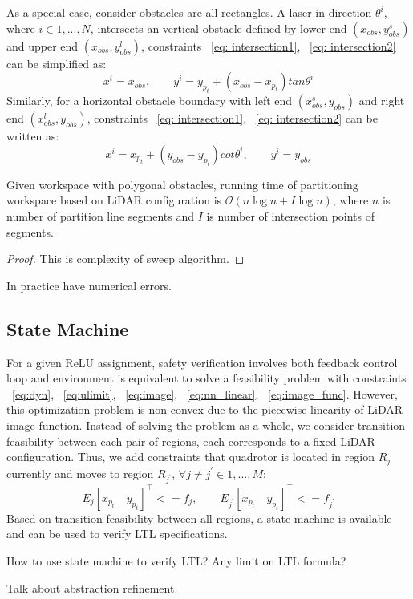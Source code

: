 As a special case, consider obstacles are all rectangles. 
A laser in direction $\theta^i$, where $i \in {1, ..., N}$, intersects an vertical obstacle 
defined by lower end $(x_{obs}, y_{obs}^s)$ and upper end $(x_{obs}, y_{obs}^l)$, 
constraints ~\eqref{eq: intersection1}, ~\eqref{eq: intersection2} can be simplified as:
\begin{equation}
    \label{eq:vertical}
    x^i = x_{obs}, \qquad y^i = y_{p_t} + (x_{obs} - x_{p_t}) tan \theta^i
\end{equation}
Similarly, for a horizontal obstacle boundary with left end $(x_{obs}^s, y_{obs})$ and right end $(x_{obs}^l, y_{obs})$,
constraints ~\eqref{eq: intersection1}, ~\eqref{eq: intersection2} can be written as:
\begin{equation} 
    \label{eq:horizontal}
    x^i = x_{p_t} + (y_{obs} - y_{p_t}) cot \theta^i, \qquad y^i = y_{obs}
\end{equation}


\begin{theorem}
    Given workspace with polygonal obstacles, running time of partitioning workspace based on LiDAR configuration is
    $\mathcal{O}(n\log{}n + I\log{}n)$, where $n$ is number of partition line segments 
    and $I$ is number of intersection points of segments.
    \begin{proof}
        {\color{blue} This is complexity of sweep algorithm.} 
    \end{proof}
\end{theorem}    

{\color{blue} In practice have numerical errors.}



\subsection{State Machine}


For a given ReLU assignment, safety verification involves both feedback control loop and environment 
is equivalent to solve a feasibility problem with constraints 
~\eqref{eq:dyn}, ~\eqref{eq:ulimit}, ~\eqref{eq:image}, ~\eqref{eq:nn_linear}, ~\eqref{eq:image_func}.
However, this optimization problem is non-convex due to the piecewise linearity of LiDAR image function.
Instead of solving the problem as a whole, we consider transition feasibility between 
each pair of regions, each corresponds to a fixed LiDAR configuration. 
Thus, we add constraints that quadrotor is located in region $R_j$ currently and moves to region $R_{j^\prime}$,
$\forall j \neq j^\prime \in {1, ..., M}$:
\begin{equation}
    \label{eq:region}
    E_j[x_{p_t} \quad y_{p_t}]^\intercal <= f_j, \qquad E_{j^\prime}[x_{p_t} \quad y_{p_t}]^\intercal <= f_{j^\prime}
\end{equation}
Based on transition feasibility between all regions, a state machine is available and can be used to verify
LTL specifications.

{\color{blue} How to use state machine to verify LTL?}
{\color{blue} Any limit on LTL formula?}

{\color{blue} Talk about abstraction refinement.}

